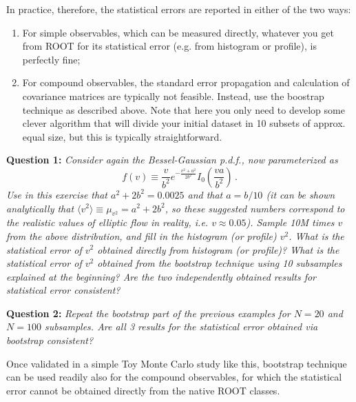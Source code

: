 \documentclass[11pt]{article}
\begin{document}
In practice, therefore, the statistical errors are reported in either of the two ways:
%
\begin{enumerate}
\item For simple observables, which can be measured directly, whatever you get from ROOT for its statistical error (e.g. from histogram or profile), is perfectly fine;
%
\item For compound observables, the standard error propagation and calculation of covariance matrices are typically not feasible. Instead, use the boostrap technique as described above. Note that here you only need to develop some clever algorithm that will divide your initial dataset in 10 subsets of approx. equal size, but this is typically straightforward. 
\end{enumerate}

\bigskip

\noindent\textbf{Question 1:} {\it Consider again the Bessel-Gaussian p.d.f., now parameterized as
%
\begin{equation}
f(v)\equiv\frac{v}{b^2}e^{-\frac{v^2+a^2}{2b^2}}I_0(\frac{va}{b^2})\,.
\label{eq:BesselGaussianPDF}
\end{equation}
%
Use in this exercise that $a^2 + 2b^2 = 0.0025$ and that $a=b/10$ (it can be shown analytically that $\langle v^2\rangle \equiv \mu_{v^2} = a^2 + 2b^2$, so these suggested numbers correspond to the realistic values of elliptic flow in reality, i.e. $v \approx 0.05$). Sample 10M times $v$ from the above distribution, and fill in the histogram (or profile) $v^2$. What is the statistical error of $v^2$ obtained directly from histogram (or profile)? What is the statistical error of $v^2$ obtained from the bootstrap technique using 10 subsamples explained at the beginning? Are the two independently obtained results for statistical error consistent?}

\bigskip

\noindent\textbf{Question 2:} {\it Repeat the bootstrap part of the previous examples for $N = 20$ and $N = 100$ subsamples. Are all 3 results for the statistical error obtained via bootstrap consistent?}
	
\bigskip	
	
Once validated in a simple Toy Monte Carlo study like this, bootstrap technique can be used readily also for the compound observables, for which the statistical error cannot be obtained directly from the native ROOT classes.
\end{document}
